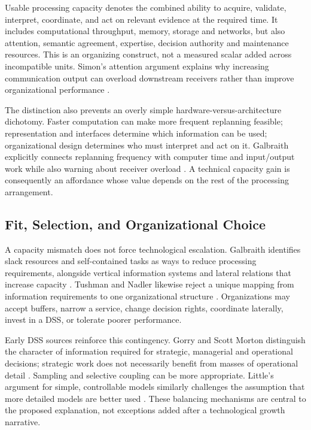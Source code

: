 \documentclass[journal]{IEEEtran}
\begin{document}
Usable processing capacity denotes the combined ability to acquire, validate, interpret, coordinate, and act on relevant evidence at the required time. It includes computational throughput, memory, storage and networks, but also attention, semantic agreement, expertise, decision authority and maintenance resources. This is an organizing construct, not a measured scalar added across incompatible units. Simon's attention argument explains why increasing communication output can overload downstream receivers rather than improve organizational performance \cite{SIMON1971}.

The distinction also prevents an overly simple hardware-versus-architecture dichotomy. Faster computation can make more frequent replanning feasible; representation and interfaces determine which information can be used; organizational design determines who must interpret and act on it. Galbraith explicitly connects replanning frequency with computer time and input/output work while also warning about receiver overload \cite{GALBRAITH1974}. A technical capacity gain is consequently an affordance whose value depends on the rest of the processing arrangement.

\subsection{Fit, Selection, and Organizational Choice}
A capacity mismatch does not force technological escalation. Galbraith identifies slack resources and self-contained tasks as ways to reduce processing requirements, alongside vertical information systems and lateral relations that increase capacity \cite{GALBRAITH1974}. Tushman and Nadler likewise reject a unique mapping from information requirements to one organizational structure \cite{TUSHMAN1978}. Organizations may accept buffers, narrow a service, change decision rights, coordinate laterally, invest in a DSS, or tolerate poorer performance.

Early DSS sources reinforce this contingency. Gorry and Scott Morton distinguish the character of information required for strategic, managerial and operational decisions; strategic work does not necessarily benefit from masses of operational detail \cite{gorry1971}. Sampling and selective coupling can be more appropriate. Little's argument for simple, controllable models similarly challenges the assumption that more detailed models are better used \cite{little1969}. These balancing mechanisms are central to the proposed explanation, not exceptions added after a technological growth narrative.
\end{document}
